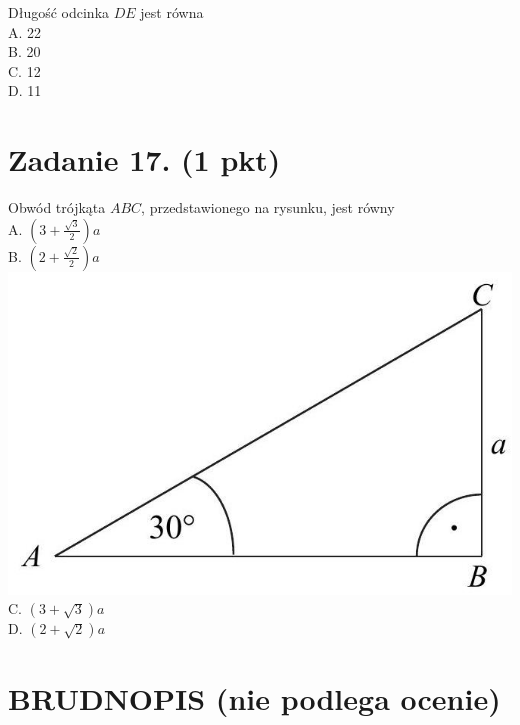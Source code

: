 \documentclass[10pt]{article}
\begin{document}
Długość odcinka \(D E\) jest równa\\
A. 22\\
B. 20\\
C. 12\\
D. 11

\section*{Zadanie 17. (1 pkt)}
Obwód trójkąta \(A B C\), przedstawionego na rysunku, jest równy\\
A. \(\left(3+\frac{\sqrt{3}}{2}\right) a\)\\
B. \(\left(2+\frac{\sqrt{2}}{2}\right) a\)\\
\includegraphics[max width=\textwidth, center]{2024_11_21_ad8c43efe74fa059d24eg-10}\\
C. \((3+\sqrt{3}) a\)\\
D. \((2+\sqrt{2}) a\)

\section*{BRUDNOPIS (nie podlega ocenie)}
\end{document}
